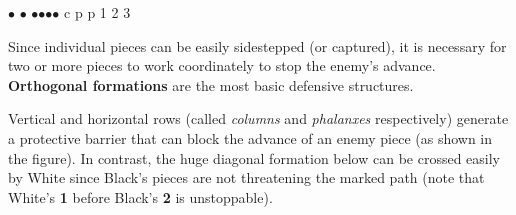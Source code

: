 \documentclass[a4paper,12pt]{article}
\begin{document}
\newpage


    \begin{minipage}[c]{0.36\linewidth}
        \begin{center}
            \begin{othelloboardnorefs}{0.75}
                \annotationsfirstrow	{} {} {} {} {} {} {} {}
                \annotationssecondrow	{$\bullet$} {} {$\bullet$} {} {} {} {} {}
                 {$\bullet$}{} {$\bullet$}{$\bullet$}{$\bullet$}{$\bullet$}
                \annotationsfourthrow	{} {{\sffamily c}} {} {} {} {{\sffamily p}} {{\sffamily p}} {}
                \annotationsfifthrow	{} {} {} {} {} {} {} {}
                \annotationssixthrow	{} {} {} {} {1}{} {} {}
                \annotationsseventhrow	{} {} {} {2}{} {} {} {}
                \annotationseighthrow	{} {} {3}{} {} {} {} {}
            \end{othelloboardnorefs}
        \end{center}
    \end{minipage}
    \hfill
    \begin{minipage}[c]{0.62\linewidth}
        Since individual pieces can be easily sidestepped (or captured), it is necessary for two or more pieces to work coordinately to stop the enemy's advance.  \textbf{Orthogonal formations} are the most basic defensive structures.

        Vertical and horizontal rows (called \emph{columns} and \emph{phalanxes} respectively) generate a protective barrier that can block the advance of an enemy piece (as shown in the figure).  In contrast, the huge diagonal formation below can be crossed easily by White since Black's pieces are not threatening the marked path (note that White's \textbf{1} before Black's \textbf{2} is unstoppable).
    \end{minipage}
\end{document}

